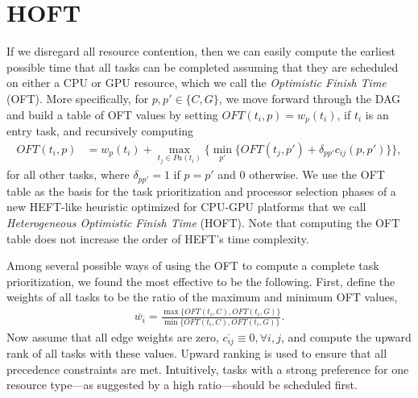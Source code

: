 \documentclass[runningheads]{llncs}
\begin{document}
\section{HOFT}
\label{sect.hoft}

If we disregard all resource contention, then we can easily compute the earliest possible time that all tasks can be completed assuming that they are scheduled on either a CPU or GPU resource, which we call the {\em Optimistic Finish Time} (OFT). More specifically, for $p, p' \in \{C, G\}$, we move forward through the DAG and build a table of OFT values by setting $OFT(t_i, p) = w_p(t_i)$, if $t_i$ is an entry task, and recursively computing     
\begin{align}
\label{eq.oft_table}
OFT(t_i, p) &= w_p(t_i) + \max_{t_j \in Pa(t_i)} \bigg \{ \min_{p'} \{ OFT(t_j, p') + \delta_{pp'} c_{ij} (p, p') \}  \bigg \}, 
\end{align}
for all other tasks, where $\delta_{pp'} = 1$ if $p = p'$ and $0$ otherwise. We use the OFT table as the basis for the task prioritization and processor selection phases of a new HEFT-like heuristic optimized for CPU-GPU platforms that we call {\em Heterogeneous Optimistic Finish Time} (HOFT). Note that computing the OFT table does not increase the order of HEFT's time complexity.  


Among several possible ways of using the OFT to compute a complete task prioritization, we found the most effective to be the following. First, define the weights of all tasks to be the ratio of the maximum and minimum OFT values,
\begin{align}
\label{eq.hoft_weights}
\overline{w_i} = \frac{\max\{ OFT(t_i, C), OFT(t_i, G) \}}{\min\{ OFT(t_i, C), OFT(t_i, G) \}}.
\end{align} 
Now assume that all edge weights are zero, $\overline{c_{ij}} \equiv 0, \forall i, j$, and compute the upward rank of all tasks with these values. Upward ranking is used to ensure that all precedence constraints are met. Intuitively, tasks with a strong preference for one resource type---as suggested by a high ratio---should be scheduled first. 
\end{document}
